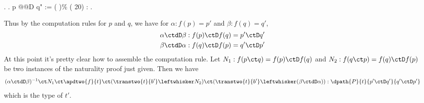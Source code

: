 \begin{coqdoccode}
\coqdocindent{1.00em}
 .\coqdoceol
\coqdocnoindent
{}.\coqdoceol
\coqdocemptyline
\coqdocnoindent
{} p @@D q" := (  )\% (  20) : .\coqdoceol
\coqdocemptyline
\end{coqdoccode}
\noindent
Thus by the computation rules for $p$ and $q$,
we have for $\alpha : f(p) = p'$ and $\beta : f(q) = q'$,
\begin{align*}
  \alpha \ctdD \beta &: f(p) \ctD f(q) = p' \ctD q' \\
  \beta \ctdD \alpha &: f(q) \ctD f(p) = q' \ctD p'
\end{align*}
At this point it's pretty clear how to assemble the computation rule.
Let $N_{1} : f(p \ct q) = f(p) \ctD f(q)$ and $N_{2} : f(q \ct p) = f(q) \ctD
f(p)$ be two instances of the naturality proof just given.  Then we have
\[
  (\alpha \ctdD \beta)^{-1} \ct N_{1} 
  \ct \apdtwo{f}{t}
  \ct (\transtwo{t}{b'} \leftwhisker N_{2})
  \ct (\transtwo{t}{b'} \leftwhisker (\beta \ctdD \alpha))
  :
  \dpath{P}{t}{p' \ctD q'}{q' \ctD p'}
\]
which is the type of $t'$.
